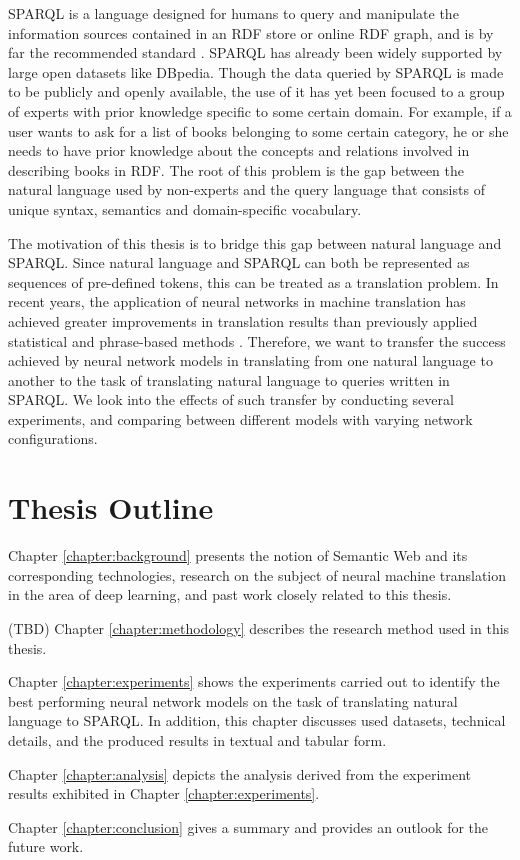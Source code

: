 SPARQL is a language designed for humans to query and manipulate the information sources contained in an RDF store or online RDF graph, and is by far the recommended standard \cite{Harris2013}. SPARQL has already been widely supported by large open datasets like DBpedia. Though the data queried by SPARQL is made to be publicly and openly available, the use of it has yet been focused to a group of experts with prior knowledge specific to some certain domain. For example, if a user wants to ask for a list of books belonging to some certain category, he or she needs to have prior knowledge about the concepts and relations involved in describing books in RDF. The root of this problem is the gap between the natural language used by non-experts and the query language that consists of unique syntax, semantics and domain-specific vocabulary. 

The motivation of this thesis is to bridge this gap between natural language and SPARQL. Since natural language and SPARQL can both be represented as sequences of pre-defined tokens, this can be treated as a translation problem. In recent years, the application of neural networks in machine translation has achieved greater improvements in translation results than previously applied statistical and phrase-based methods \cite{Moussallem2017}. Therefore, we want to transfer the success achieved by neural network models in translating from one natural language to another to the task of translating natural language to queries written in SPARQL. We look into the effects of such transfer by conducting several experiments, and comparing between different models with varying network configurations. 

\section{Thesis Outline} \label{section:thesis outline}

Chapter \ref{chapter:background} presents the notion of Semantic Web and its corresponding technologies, research on the subject of neural machine translation in the area of deep learning, and past work closely related to this thesis. 

(TBD) Chapter \ref{chapter:methodology} describes the research method used in this thesis.

Chapter \ref{chapter:experiments} shows the experiments carried out to identify the best performing neural network models on the task of translating natural language to SPARQL. In addition, this chapter discusses used datasets, technical details, and the produced results in textual and tabular form.

Chapter \ref{chapter:analysis} depicts the analysis derived from the experiment results exhibited in Chapter \ref{chapter:experiments}.

Chapter \ref{chapter:conclusion} gives a summary and provides an outlook for the future work.